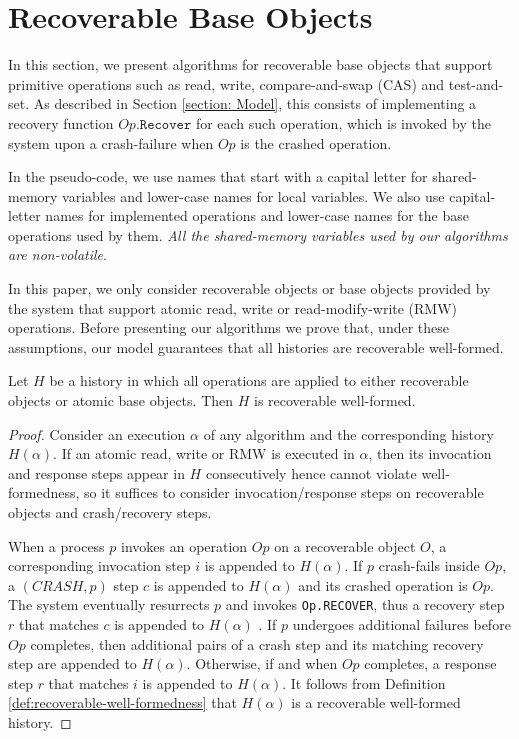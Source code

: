
\section{Recoverable Base Objects}
\label{section: Recoverable Base Objects}

In this section, we present algorithms for recoverable base objects that support primitive operations such as read, write, compare-and-swap (CAS) and test-and-set. As described in Section \ref{section: Model}, this consists of implementing a recovery function $Op.\texttt{Recover}$ for each such operation, which is invoked by the system upon a crash-failure when $Op$ is the crashed operation.

In the pseudo-code, we use names that start with a capital letter for shared-memory variables and lower-case names for local variables. We also use capital-letter names for implemented operations and lower-case names for the base operations used by them. \emph{All the shared-memory variables used by our algorithms are non-volatile}.

In this paper, we only consider recoverable objects or base objects provided by the system that support atomic read, write or read-modify-write (RMW) operations. Before presenting our algorithms we prove that, under these assumptions, our model guarantees that all histories are recoverable well-formed.

\begin{lemma}
\label{all-histories-well-formed}
Let $H$ be a history in which all operations are applied to either recoverable objects or atomic base objects. Then $H$ is recoverable well-formed.
\end{lemma}
\begin{proof}
Consider an execution $\alpha$ of any algorithm and the corresponding history $H(\alpha)$. 
If an atomic read, write or RMW is executed in $\alpha$, then its invocation and response steps appear in $H$ consecutively hence cannot violate well-formedness, so it suffices to consider invocation/response steps on recoverable objects and crash/recovery steps.

When a process $p$ invokes an operation $Op$ on a recoverable object $O$, a corresponding invocation step $i$ is appended to $H(\alpha)$. If $p$ crash-fails inside $Op$, a $(CRASH, p)$ step $c$ is appended to $H(\alpha)$ and its crashed operation is $Op$. The system eventually resurrects $p$ and invokes \texttt{Op.RECOVER}, thus a recovery step $r$ that matches $c$ is appended to $H(\alpha)$ . If $p$ undergoes additional failures before $Op$ completes, then additional pairs of a crash step and its matching recovery step are appended to $H(\alpha)$. Otherwise, if and when $Op$ completes, a response step $r$ that matches $i$ is appended to $H(\alpha)$. It follows from Definition \ref{def:recoverable-well-formedness} that $H(\alpha)$ is a recoverable well-formed history.
\end{proof}


